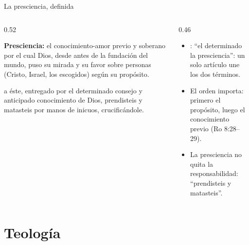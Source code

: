\begin{frame}{La presciencia, definida}
\begin{columns}[t,onlytextwidth]
\begin{column}{0.52\textwidth}
\begin{tcolorbox}[colback=papiro,colframe=dorado,boxrule=1.2pt,arc=3pt]
\small\textbf{Presciencia:} el conocimiento-amor previo y soberano por el cual Dios, desde antes de la fundación del mundo, puso su mirada y su favor sobre personas (Cristo, Israel, los escogidos) según su propósito.
\end{tcolorbox}
\begin{cita}a éste, entregado por el determinado consejo y anticipado conocimiento de Dios, prendisteis y matasteis por manos de inicuos, crucificándole.\end{cita}
\end{column}
\begin{column}{0.46\textwidth}\small
\begin{itemize}
\item {}: ``el  determinado  la presciencia'': un solo artículo une los dos términos.
\item El orden importa: primero el propósito, luego el conocimiento previo (Ro 8:28--29).
\item La presciencia no quita la responsabilidad: ``prendisteis y matasteis''.
\end{itemize}
\end{column}
\end{columns}
\end{frame}

\section{Teología}

